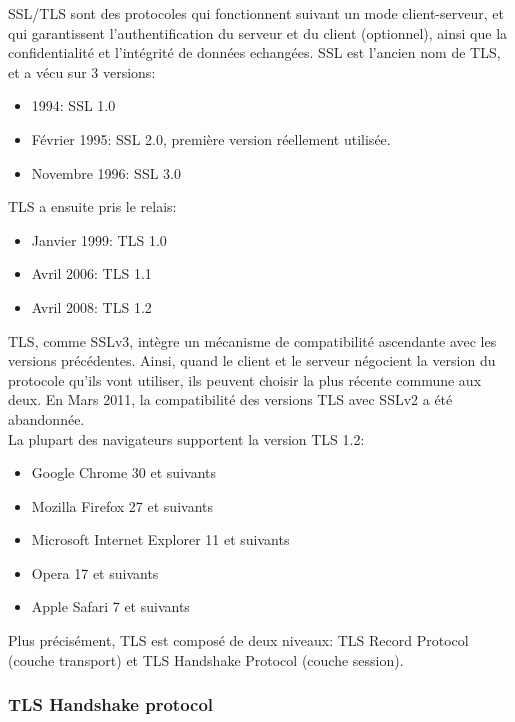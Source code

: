 SSL/TLS sont des protocoles qui fonctionnent suivant un mode client-serveur, et qui garantissent l'authentification du serveur et du client (optionnel), ainsi que la confidentialité et l'intégrité de données echangées. SSL est l'ancien nom de TLS, et a vécu sur 3 versions:
\begin{itemize}
\item 1994: SSL 1.0
\item Février 1995: SSL 2.0, première version réellement utilisée.
\item Novembre 1996: SSL 3.0 
\end{itemize}
TLS a ensuite pris le relais: 
\begin{itemize}
\item Janvier 1999: TLS 1.0
\item Avril 2006: TLS 1.1
\item Avril 2008: TLS 1.2
\end{itemize}
TLS, comme SSLv3, intègre un mécanisme de compatibilité ascendante avec les versions précédentes. Ainsi, quand le client et le serveur négocient la version du protocole qu'ils vont utiliser, ils peuvent choisir la plus récente commune aux deux. En Mars 2011, la compatibilité des versions TLS avec SSLv2 a été abandonnée. \\
La plupart des navigateurs supportent la version TLS 1.2:
\begin{itemize}
\item Google Chrome 30 et suivants
\item Mozilla Firefox 27 et suivants
\item Microsoft Internet Explorer 11 et suivants
\item Opera 17 et suivants
\item Apple Safari 7 et suivants
\end{itemize}
Plus précisément, TLS est composé de deux niveaux: TLS Record Protocol (couche transport) et TLS Handshake Protocol (couche session).

\subsubsection{TLS Handshake protocol}

